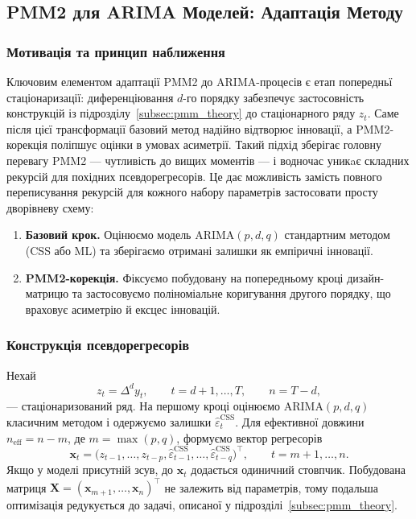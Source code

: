 \documentclass[12pt,a4paper]{article}
\begin{document}
\subsection{PMM2 для ARIMA Моделей: Адаптація Методу}
\label{subsec:pmm2_arima}

\subsubsection{Мотивація та принцип наближення}

Ключовим елементом адаптації PMM2 до ARIMA-процесів є етап попередньї стаціонаризації: диференціювання $d$-го порядку забезпечує застосовність конструкцій із підрозділу~\ref{subsec:pmm_theory} до стаціонарного ряду $z_t$. Саме після цієї трансформації базовий метод надійно відтворює інновації, а PMM2-корекція поліпшує оцінки в умовах асиметрії. Такий підхід зберігає головну перевагу PMM2 --- чутливість до вищих моментів --- і водночас уникaє складних рекурсій для похідних псевдорегресорів. Це дає можливість замість повного переписування рекурсій для кожного набору параметрів застосовати просту дворівневу схему:

\begin{enumerate}
    \item \textbf{Базовий крок.} Оцінюємо модель ARIMA$(p,d,q)$ стандартним методом (CSS або ML) та зберігаємо отримані залишки як емпіричні інновації.
    \item \textbf{PMM2-корекція.} Фіксуємо побудовану на попередньому кроці дизайн-матрицю та застосовуємо поліноміальне коригування другого порядку, що враховує асиметрію й ексцес інновацій.
\end{enumerate}

\subsubsection{Конструкція псевдорегресорів}

Нехай
\begin{equation}
\label{eq:differenced_series}
z_t = \Delta^d y_t,\qquad t=d+1,\ldots,T,\qquad n = T-d,
\end{equation}
--- стаціонаризований ряд. На першому кроці оцінюємо ARIMA$(p,d,q)$ класичним методом і одержуємо залишки $\widehat{\varepsilon}_t^{\text{CSS}}$. Для ефективної довжини $n_\text{eff} = n - m$, де $m = \max(p,q)$, формуємо вектор регресорів
\begin{equation}
\label{eq:design_row}
\mathbf{x}_t = \big(z_{t-1},\ldots,z_{t-p},\widehat{\varepsilon}_{t-1}^{\text{CSS}},\ldots,\widehat{\varepsilon}_{t-q}^{\text{CSS}}\big)^\top,
\qquad t = m+1,\ldots,n.
\end{equation}
Якщо у моделі присутній зсув, до $\mathbf{x}_t$ додається одиничний стовпчик. Побудована матриця $\mathbf{X} = (\mathbf{x}_{m+1},\ldots,\mathbf{x}_{n})^\top$ не залежить від параметрів, тому подальша оптимізація редукується до задачі, описаної у підрозділі~\ref{subsec:pmm_theory}.
\end{document}
